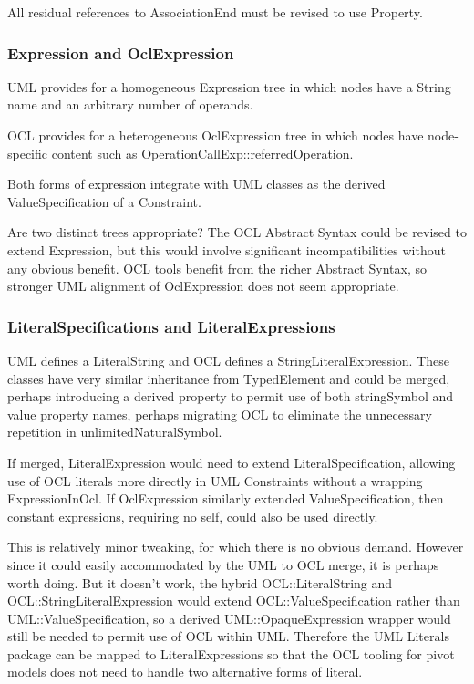\documentclass{eceasst}
\begin{document}
All residual references to AssociationEnd must be revised to use Property.

\subsubsection{Expression and OclExpression}

UML provides for a homogeneous Expression tree in which nodes have a String name and an arbitrary number of operands.

OCL provides for a heterogeneous OclExpression tree in which nodes have node-specific content such as OperationCallExp::referredOperation.

Both forms of expression integrate with UML classes as the derived ValueSpecification of a Constraint.

Are two distinct trees appropriate? The OCL Abstract Syntax could be revised to extend Expression, but this would involve significant incompatibilities without any obvious benefit. OCL tools benefit from the richer Abstract Syntax, so stronger UML alignment of OclExpression does not seem appropriate.

\subsubsection{LiteralSpecifications and LiteralExpressions}

UML defines a LiteralString and OCL defines a StringLiteralExpression. These classes have very similar inheritance from TypedElement and could be merged, perhaps introducing a derived property to permit use of both stringSymbol and value property names, perhaps migrating OCL to eliminate the unnecessary repetition in unlimitedNaturalSymbol.

If merged, LiteralExpression would need to extend LiteralSpecification, allowing use of OCL literals more directly in UML Constraints without a wrapping ExpressionInOcl. If OclExpression similarly extended ValueSpecification, then constant expressions, requiring no self, could also be used directly.

This is relatively minor tweaking, for which there is no obvious demand. However since it could easily accommodated by the UML to OCL merge, it is perhaps worth doing. But it doesn't work, the hybrid OCL::LiteralString and OCL::StringLiteralExpression would extend OCL::ValueSpecification rather than UML::ValueSpecification, so a derived UML::OpaqueExpression wrapper would still be needed to permit use of OCL within UML. Therefore the UML Literals package can be mapped to LiteralExpressions so that the OCL tooling for pivot models does not need to handle two alternative forms of literal. 
\end{document}
